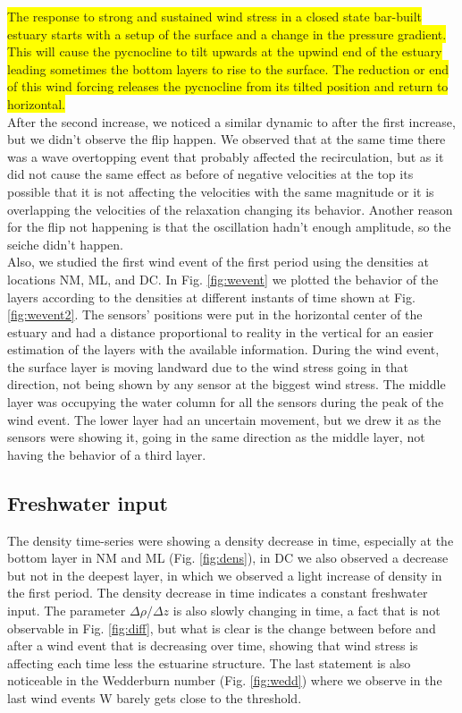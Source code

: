 \documentclass[tesis.tex]{subfiles}
\begin{document}
\colorbox{yellow}{The response to strong and sustained wind stress in a closed state bar-built estuary starts with a setup of the surface and a change in the pressure gradient. This will cause the pycnocline to tilt upwards at the upwind end of the estuary leading sometimes the bottom layers to rise to the surface. The reduction or end of this wind forcing releases the pycnocline from its tilted position and return to horizontal.} \\

After the second increase, we noticed a similar dynamic to after the first increase, but we didn't observe the flip happen. We observed that at the same time there was a wave overtopping event that probably affected the recirculation, but as it did not cause the same effect as before of negative velocities at the top its possible that it is not affecting the velocities with the same magnitude or it is overlapping the velocities of the relaxation changing its behavior. Another reason for the flip not happening is that the oscillation hadn't enough amplitude, so the seiche didn't happen.\\

Also, we studied the first wind event of the first period using the densities at locations NM, ML, and DC. In Fig. \ref{fig:wevent} we plotted the behavior of the layers according to the densities at different instants of time shown at Fig. \ref{fig:wevent2}. The sensors' positions were put in the horizontal center of the estuary and had a distance proportional to reality in the vertical for an easier estimation of the layers with the available information. During the wind event, the surface layer is moving landward due to the wind stress going in that direction, not being shown by any sensor at the biggest wind stress. The middle layer was occupying the water column for all the sensors during the peak of the wind event. The lower layer had an uncertain movement, but we drew it as the sensors were showing it, going in the same direction as the middle layer, not having the behavior of a third layer.\\

\subsection{Freshwater input}

The density time-series were showing a density decrease in time, especially at the bottom layer in NM and ML (Fig. \ref{fig:dens}), in DC we also observed a decrease but not in the deepest layer, in which we observed a light increase of density in the first period. The density decrease in time indicates a constant freshwater input. The parameter $\Delta \rho / \Delta z$ is also slowly changing in time, a fact that is not observable in Fig. \ref{fig:diff}, but what is clear is the change between before and after a wind event that is decreasing over time, showing that wind stress is affecting each time less the estuarine structure. The last statement is also noticeable in the Wedderburn number (Fig. \ref{fig:wedd}) where we observe in the last wind events W barely gets close to the threshold.\\
\end{document}
